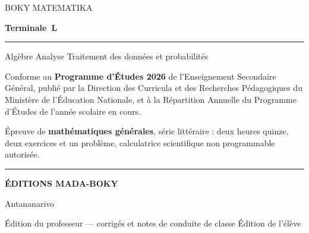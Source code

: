\cleardoublepage
\thispagestyle{empty}
\begingroup
\raggedright
\vspace*{3.2cm}

{\sffamily\fontsize{11}{14}\selectfont\color{bmtGris} BOKY MATEMATIKA\par}
\vspace{0.5em}
{\sffamily\bfseries\fontsize{40}{44}\selectfont\color{bmtIndigo} Terminale~L\par}
\vspace{0.9em}
{\color{bmtRaphia}\rule{4cm}{2.6pt}\par}
\vspace{1.4em}
{\sffamily\fontsize{12}{18}\selectfont
 Algèbre \quad Analyse \quad Traitement des données et probabilités\par}

\vspace{2.6cm}
{\normalsize
 Conforme au \textbf{Programme d'Études 2026} de l'Enseignement Secondaire
 Général, publié par la Direction des Curricula et des Recherches
 Pédagogiques du Ministère de l'Éducation Nationale, et à la Répartition
 Annuelle du Programme d'Études de l'année scolaire en cours.\par}

\vspace{1.1em}
{\normalsize
 Épreuve de \textbf{mathématiques générales}, série littéraire : deux
 heures quinze, deux exercices et un problème, calculatrice scientifique
 non programmable autorisée.\par}

\vfill

{\color{bmtIndigo}\rule{1.4cm}{1.6pt}\par}
\vspace{0.5em}
{\sffamily\bfseries\fontsize{13}{17}\selectfont\color{bmtIndigo} ÉDITIONS MADA-BOKY\par}
\vspace{0.3em}
{\sffamily\footnotesize\color{bmtGris} Antananarivo\par}

\vspace{1.2em}
{\sffamily\footnotesize\color{bmtGris}
 \ifbmtprof Édition du professeur — corrigés et notes de conduite de classe
 \else Édition de l'élève\fi\par}
\endgroup
\cleardoublepage
